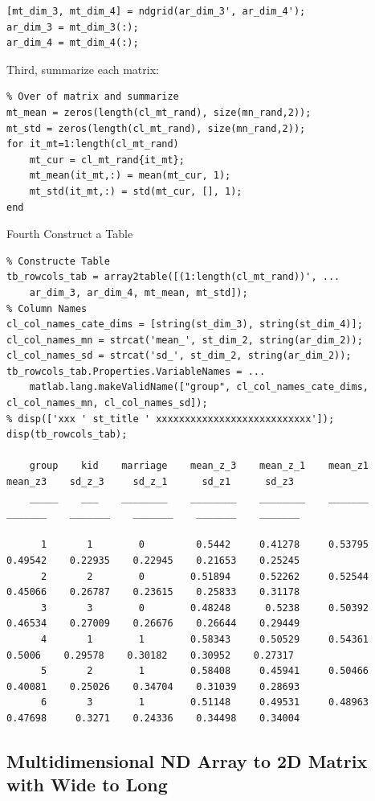\documentclass[
]{book}
\begin{document}
\begin{verbatim}
[mt_dim_3, mt_dim_4] = ndgrid(ar_dim_3', ar_dim_4');
ar_dim_3 = mt_dim_3(:);
ar_dim_4 = mt_dim_4(:);
\end{verbatim}

Third, summarize each matrix:

\begin{verbatim}
% Over of matrix and summarize
mt_mean = zeros(length(cl_mt_rand), size(mn_rand,2));
mt_std = zeros(length(cl_mt_rand), size(mn_rand,2));
for it_mt=1:length(cl_mt_rand)
    mt_cur = cl_mt_rand{it_mt};
    mt_mean(it_mt,:) = mean(mt_cur, 1);
    mt_std(it_mt,:) = std(mt_cur, [], 1);
end
\end{verbatim}

Fourth Construct a Table

\begin{verbatim}
% Constructe Table
tb_rowcols_tab = array2table([(1:length(cl_mt_rand))', ...
    ar_dim_3, ar_dim_4, mt_mean, mt_std]);
% Column Names
cl_col_names_cate_dims = [string(st_dim_3), string(st_dim_4)];
cl_col_names_mn = strcat('mean_', st_dim_2, string(ar_dim_2));
cl_col_names_sd = strcat('sd_', st_dim_2, string(ar_dim_2));
tb_rowcols_tab.Properties.VariableNames = ...
    matlab.lang.makeValidName(["group", cl_col_names_cate_dims, cl_col_names_mn, cl_col_names_sd]);
% disp(['xxx ' st_title ' xxxxxxxxxxxxxxxxxxxxxxxxxxx']);
disp(tb_rowcols_tab);

    group    kid    marriage    mean_z_3    mean_z_1    mean_z1    mean_z3    sd_z_3     sd_z_1      sd_z1      sd_z3 
    _____    ___    ________    ________    ________    _______    _______    _______    _______    _______    _______

      1       1        0         0.5442     0.41278     0.53795    0.49542    0.22935    0.22945    0.21653    0.25245
      2       2        0        0.51894     0.52262     0.52544    0.45066    0.26787    0.23615    0.25833    0.31178
      3       3        0        0.48248      0.5238     0.50392    0.46534    0.27009    0.26676    0.26644    0.29449
      4       1        1        0.58343     0.50529     0.54361     0.5006    0.29578    0.30182    0.30952    0.27317
      5       2        1        0.58408     0.45941     0.50466    0.40081    0.25026    0.34704    0.31039    0.28693
      6       3        1        0.51148     0.49531     0.48963    0.47698     0.3271    0.24336    0.34498    0.34004
\end{verbatim}

\hypertarget{multidimensional-nd-array-to-2d-matrix-with-wide-to-long}{%
\subsection{Multidimensional ND Array to 2D Matrix with Wide to Long}\label{multidimensional-nd-array-to-2d-matrix-with-wide-to-long}}
\end{document}
